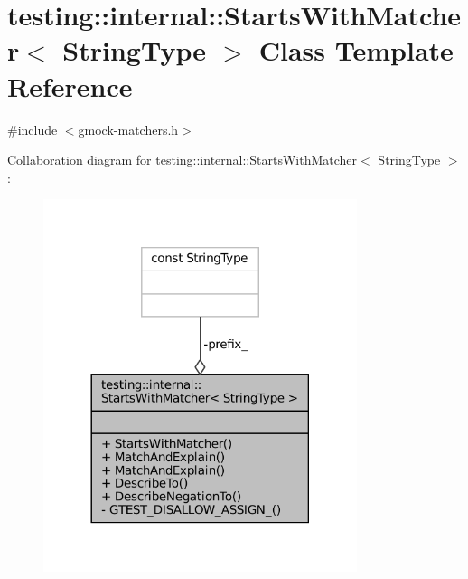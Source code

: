 \hypertarget{classtesting_1_1internal_1_1StartsWithMatcher}{}\section{testing\+:\+:internal\+:\+:Starts\+With\+Matcher$<$ String\+Type $>$ Class Template Reference}
\label{classtesting_1_1internal_1_1StartsWithMatcher}


{\ttfamily \#include $<$gmock-\/matchers.\+h$>$}



Collaboration diagram for testing\+:\+:internal\+:\+:Starts\+With\+Matcher$<$ String\+Type $>$\+:
\nopagebreak
\begin{figure}[H]
\begin{center}
\leavevmode
\includegraphics[width=260pt]{classtesting_1_1internal_1_1StartsWithMatcher__coll__graph}
\end{center}
\end{figure}
